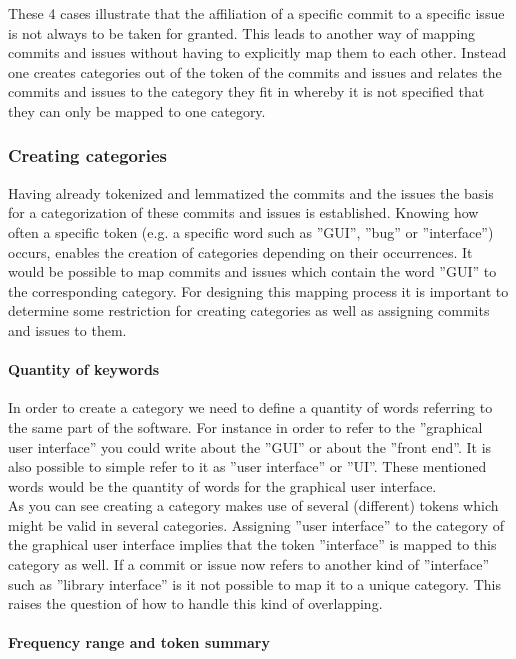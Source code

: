 These 4 cases illustrate that the affiliation of a specific commit to a specific issue is not always to be taken for granted.
This leads to another way of mapping commits and issues without having to explicitly map them to each other.
Instead one creates categories out of the token of the commits and issues and relates the commits and issues to the category they fit in whereby it is not specified that they can only be mapped to one category.

\subsubsection{Creating categories}

Having already tokenized and lemmatized the commits and the issues the basis for a categorization of these commits and issues is established.
Knowing how often a specific token (e.g. a specific word such as ''GUI'', ''bug'' or ''interface'') occurs, enables the creation of categories  depending on their occurrences.
It would be possible to map commits and issues which contain the word ''GUI'' to the corresponding category.
For designing this mapping process it is important to determine some restriction for creating categories as well as assigning commits and issues to them. 

\paragraph{Quantity of keywords}

In order to create a category we need to define a quantity of words referring to the same part of the software.
For instance in order to refer to the ''graphical user interface'' you could write about the ''GUI'' or about the ''front end''.
It is also possible to simple refer to it as ''user interface'' or ''UI''.
These mentioned words would be the quantity of words for the graphical user interface. \\

As you can see creating a category makes use of several (different) tokens which might be valid in several categories.
Assigning ''user interface'' to the category of the graphical user interface implies that the token ''interface'' is mapped to this category as well.
If a commit or issue now refers to another kind of ''interface'' such as ''library interface'' is it not possible to map it to a unique category.
This raises the question of how to handle this kind of overlapping. 

\paragraph{Frequency range and token summary}

